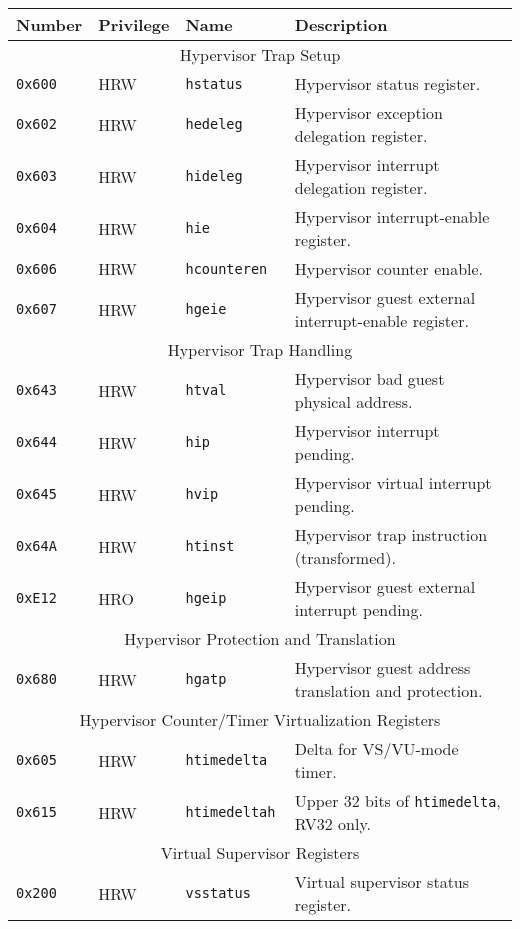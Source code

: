 \begin{table}[htb!]
\begin{center}
\begin{tabular}{|l|l|l|l|}
\hline
Number    & Privilege & Name & Description \\
\hline
\multicolumn{4}{|c|}{Hypervisor Trap Setup} \\
\hline
\hline
\tt 0x600 & HRW  &\tt hstatus    & Hypervisor status register. \\
\tt 0x602 & HRW  &\tt hedeleg    & Hypervisor exception delegation register. \\
\tt 0x603 & HRW  &\tt hideleg    & Hypervisor interrupt delegation register. \\
\tt 0x604 & HRW  &\tt hie        & Hypervisor interrupt-enable register. \\
\tt 0x606 & HRW  &\tt hcounteren & Hypervisor counter enable. \\
\tt 0x607 & HRW  &\tt hgeie      & Hypervisor guest external interrupt-enable register. \\
\hline
\multicolumn{4}{|c|}{Hypervisor Trap Handling} \\
\hline
\tt 0x643 & HRW  &\tt htval      & Hypervisor bad guest physical address. \\
\tt 0x644 & HRW  &\tt hip        & Hypervisor interrupt pending. \\
\tt 0x645 & HRW  &\tt hvip       & Hypervisor virtual interrupt pending. \\
\tt 0x64A & HRW  &\tt htinst     & Hypervisor trap instruction (transformed). \\
\tt 0xE12 & HRO  &\tt hgeip      & Hypervisor guest external interrupt pending. \\
\hline
\multicolumn{4}{|c|}{Hypervisor Protection and Translation} \\
\hline
\tt 0x680 & HRW  &\tt hgatp      & Hypervisor guest address translation and protection. \\
\hline
\multicolumn{4}{|c|}{Hypervisor Counter/Timer Virtualization Registers} \\
\hline
\tt 0x605 & HRW  &\tt htimedelta   & Delta for VS/VU-mode timer. \\
\tt 0x615 & HRW  &\tt htimedeltah  & Upper 32 bits of {\tt htimedelta}, RV32 only. \\
\hline
\multicolumn{4}{|c|}{Virtual Supervisor Registers} \\
\hline
\tt 0x200 & HRW  &\tt vsstatus   & Virtual supervisor status register. \\

\end{tabular}
\end{center}
\end{table}
